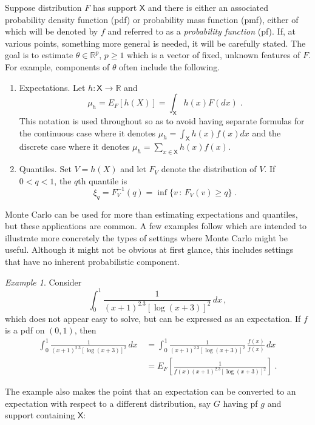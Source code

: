 \documentclass[12pt]{article}
\theoremstyle{plain}
\theoremstyle{definition}
\theoremstyle{remark}
\newtheorem{example}{Example}[section]
\newcommand{\sX}{\mathsf{X}}
\newcommand{\real}{\mathbb{R}}
\begin{document}
Suppose distribution $F$ has support $\sX$ and there is either an
associated probability density function (pdf) or probability mass
function (pmf), either of which will be denoted by $f$ and referred to
as a \textit{probability function} (pf).  If, at various points,
something more general is needed, it will be carefully stated.  The
goal is to estimate $\theta \in \mathbb{R}^p$, $p \ge 1$ which is a
vector of fixed, unknown features of $F$.  For example, components of
$\theta$ often include the following.
\begin{enumerate}
\item Expectations.  Let $h : \sX \to \real$ and 
\[
\mu_h = E_{F}[h(X)] = \int_{\sX} h(x) F(dx) \; .
\]
This notation is used throughout so as to avoid having
separate formulas for the continuous case where it denotes $\mu_{h} =
\int_{\sX} h(x) f(x) dx$ and the discrete case where it denotes
$\mu_{h} = \sum_{x \in \sX} h(x) f(x)$.

\item Quantiles.  Set $V=h(X)$ and let $F_V$ denote the distribution
  of $V$.  If $0 < q < 1$, the $q$th quantile is
\[
\xi_{q} = F_{V}^{-1}(q) = \inf \{ v \, : \, F_{V}(v) \ge q\} \; .
\]

\end{enumerate}
Monte Carlo can be used for more than estimating expectations and
quantiles, but these applications are common.  A few examples follow
which are intended to illustrate more concretely the types of
settings where Monte Carlo might be useful.  Although it might not be
obvious at first glance, this includes settings that have no inherent
probabilistic component.

\begin{example}
\label{gofmc:ex:integral}
Consider
\[
\int_{0}^{1} \frac{1}{(x+1)^{2.3} [\log ( x+3)]^{2}}\,  dx \, ,
\]
which does not appear easy to solve, but can be expressed as an
expectation.  If $f$ is a pdf on $(0,1)$, then
\begin{align*}
\int_{0}^{1} \frac{1}{(x+1)^{2.3} [\log ( x+3)]^{2}}\, dx \, & =
\int_{0}^{1} \frac{1}{(x+1)^{2.3} [\log ( x+3)]^{2}}\, \frac{f(x)}{f(x)} 
\, dx \\
& = E_{F}  \left[ \frac{1}{ f(x) (x+1)^{2.3} [\log ( x+3)]^{2}} \right]
\; .
\end{align*}
\end{example}

The example also makes the point that an expectation can be converted
to an expectation with respect to a different distribution, say $G$
having pf $g$ and support containing $\sX$:
\end{document}
